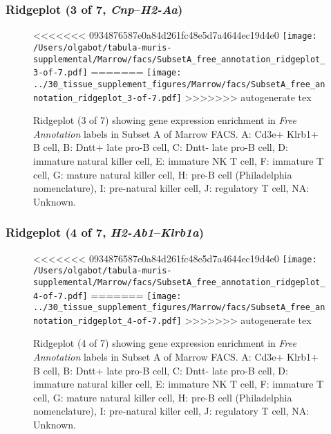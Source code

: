 \subsubsection{Ridgeplot (3 of 7, \emph{Cnp}--\emph{H2-Aa})}
\begin{figure}[h]
\centering
<<<<<<< 0934876587e0a84d261fc48e5d7a4644ec19d4e0
\texttt{[image: /Users/olgabot/tabula-muris-supplemental/Marrow/facs/SubsetA\_free\_annotation\_ridgeplot\_3-of-7.pdf]}
=======
\texttt{[image: ../30\_tissue\_supplement\_figures/Marrow/facs/SubsetA\_free\_annotation\_ridgeplot\_3-of-7.pdf]}
>>>>>>> autogenerate tex

\caption{ Ridgeplot (3 of 7)  showing gene expression enrichment in \emph{Free Annotation} labels in Subset A of Marrow FACS. A: Cd3e+ Klrb1+ B cell, B: Dntt+ late pro-B cell, C: Dntt- late pro-B cell, D: immature natural killer cell, E: immature NK T cell, F: immature T cell, G: mature natural killer cell, H: pre-B cell (Philadelphia nomenclature), I: pre-natural killer cell, J: regulatory T cell, NA: Unknown.}
\end{figure}


\clearpage

\subsubsection{Ridgeplot (4 of 7, \emph{H2-Ab1}--\emph{Klrb1a})}
\begin{figure}[h]
\centering
<<<<<<< 0934876587e0a84d261fc48e5d7a4644ec19d4e0
\texttt{[image: /Users/olgabot/tabula-muris-supplemental/Marrow/facs/SubsetA\_free\_annotation\_ridgeplot\_4-of-7.pdf]}
=======
\texttt{[image: ../30\_tissue\_supplement\_figures/Marrow/facs/SubsetA\_free\_annotation\_ridgeplot\_4-of-7.pdf]}
>>>>>>> autogenerate tex

\caption{ Ridgeplot (4 of 7)  showing gene expression enrichment in \emph{Free Annotation} labels in Subset A of Marrow FACS. A: Cd3e+ Klrb1+ B cell, B: Dntt+ late pro-B cell, C: Dntt- late pro-B cell, D: immature natural killer cell, E: immature NK T cell, F: immature T cell, G: mature natural killer cell, H: pre-B cell (Philadelphia nomenclature), I: pre-natural killer cell, J: regulatory T cell, NA: Unknown.}
\end{figure}


\clearpage

